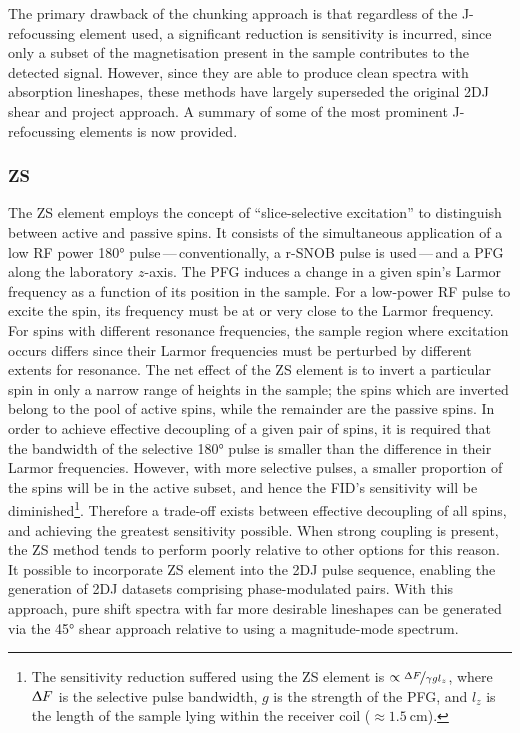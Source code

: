 The primary drawback of the chunking approach is that regardless of the
J-refocussing element used, a significant reduction is sensitivity is incurred,
since only a subset of the magnetisation present in the sample contributes to
the detected signal. However, since they are able to produce clean
spectra with absorption lineshapes, these methods have largely superseded the
original \ac{2DJ} shear and project approach. A summary of some of the most
prominent J-refocussing elements is now provided.

\subsubsection{\ac{ZS}}
\label{subsec:ZS}
The \ac{ZS} element employs the concept of ``slice-selective excitation'' to
distinguish between active and passive spins\cite{Zangger1997,Aguilar2010}. It
consists of the simultaneous application of a low \ac{RF} power \ang{180}
pulse\,---\,conventionally, a r-SNOB pulse is used\cite{Kupce1995}\,---\,and a
\ac{PFG} along the laboratory $z$-axis.
The \ac{PFG} induces a change in a given spin's Larmor frequency as a
function of its position in the sample. For a low-power \ac{RF} pulse to excite the
spin, its
frequency must be at or very close to the Larmor frequency.
For spins with different resonance frequencies, the sample region where
excitation occurs differs since their Larmor frequencies must be perturbed by
different extents for resonance.
The net effect of the \ac{ZS} element is to invert a particular spin in only a
narrow range of heights in the sample; the spins which are inverted belong to
the pool of active spins, while the remainder are the passive spins.
In order to achieve effective decoupling of a given pair of spins, it is required
that the bandwidth of the selective \ang{180} pulse is smaller than the
difference in their Larmor frequencies. However, with more selective pulses,
a smaller proportion of the spins will be in the active subset, and hence the
\ac{FID}'s sensitivity will be diminished\footnote{
    The sensitivity reduction suffered using the \ac{ZS} element is $\propto
    \nicefrac{\Updelta F}{\gamma g l_z}$, where $\Updelta F$ is the selective
    pulse bandwidth, $g$ is the strength of the \ac{PFG}, and $l_z$ is the
    length of the sample lying within the receiver coil ($\approx
    \qty{1.5}{\centi\meter}$).
}.
Therefore a trade-off exists between effective decoupling of all spins, and
achieving the greatest sensitivity possible. When strong coupling is present,
the \ac{ZS} method tends to perform poorly relative to other options for this
reason. It possible to incorporate \ac{ZS} element into the \ac{2DJ} pulse
sequence, enabling the generation of \ac{2DJ} datasets comprising
phase-modulated pairs\cite{Pell2007}. With this approach, pure
shift spectra with far more desirable lineshapes can be generated via the
\ang{45} shear approach relative to using a magnitude-mode spectrum.

